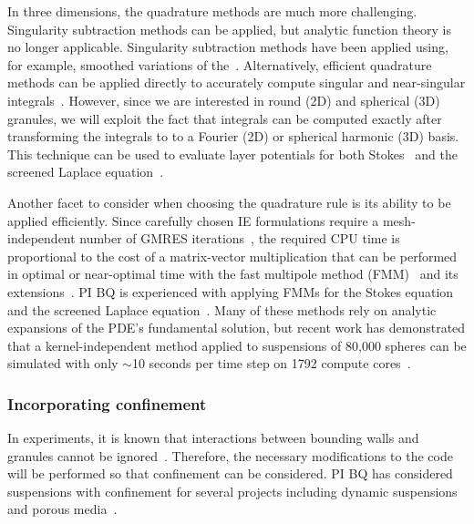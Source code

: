 In three dimensions, the quadrature methods are much more challenging.
Singularity subtraction methods can be applied, but analytic function
theory is no longer applicable. Singularity subtraction methods have
been applied using, for example, smoothed variations of
the~\cite{beale1, cor2001, tlu-bea2019}. Alternatively, efficient
quadrature methods can be applied directly to accurately compute
singular and near-singular integrals~\cite{khayat_2005,
gimbutas2013sisc}. However, since we are interested in round (2D) and
spherical (3D) granules, we will exploit the fact that integrals can be
computed exactly after transforming the integrals to to a Fourier (2D)
or spherical harmonic (3D) basis. This technique can be used to evaluate
layer potentials for both Stokes~\cite{cor-vee2018} and the screened
Laplace equation~\cite{koh-cor-che-vee2021}.

Another facet to consider when choosing the quadrature rule is its
ability to be applied efficiently. Since carefully chosen IE
formulations require a mesh-independent number of GMRES
iterations~\cite{cam-ips-kel-mey-xue1996}, the required CPU time is
proportional to the cost of a matrix-vector multiplication that can be
performed in optimal or near-optimal time with the fast multipole method
(FMM)~\cite{fmm5} and its extensions~\cite{fmm1, fmm2, fmm3, fmm4, fmm6,
fmm7, ros-ols2016}. PI BQ is experienced with applying FMMs for the
Stokes equation~\cite{qua-bir2014, bys-sha-qua2020} and the screened
Laplace equation~\cite{kro-qua2011, qua2011}. Many of these methods rely
on analytic expansions of the PDE's fundamental solution, but recent
work has demonstrated that a kernel-independent method applied to
suspensions of 80,000 spheres can be simulated with only $\sim$10
seconds per time step on 1792 compute cores~\cite{Yan2019}.

%

\subsubsection{Incorporating confinement}
\label{subsec:Confinement}
In experiments, it is known that interactions between bounding walls and
granules cannot be ignored~\cite{qua-gan-you2021,
KaouiHartingMisbah2011_PRE, her-sto-gra2005}. Therefore, the necessary
modifications to the code will be performed so that confinement can be
considered. PI BQ has considered suspensions with confinement for
several projects including dynamic suspensions~\cite{qua-bir2014,
bys-sha-qua2020} and porous media~\cite{chi-moo-qua2020,
dea-qua-bir-jua2018, moo-che-chi-qua2022, qua-gan-you2021}.


